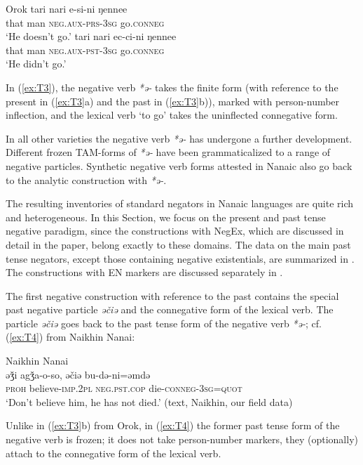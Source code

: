 \documentclass[output=paper]{langscibook}
\begin{document}
\ea Orok \label{ex:T3}
  \ea
	\gll tari	nari	e-si-ni	ŋennee\\
	that	man	\textsc{neg.aux-prs-3sg}	go.\textsc{conneg}\\
    \glt `He doesn’t go.' \citep[13]{tsumagari2009a}
  \ex
	\gll tari	nari	ec-ci-ni	ŋennee\\
	that	man	\textsc{neg.aux-pst-3sg}	go.\textsc{conneg}\\
	\glt `He didn’t go.' \citep[13]{tsumagari2009a}
\z \z

In (\ref{ex:T3}), the negative verb \textit{*ə-} takes the finite form (with reference to the present in (\ref{ex:T3}a) and the past in (\ref{ex:T3}b)), marked with person-number inflection, and the lexical verb ‘to go’ takes the uninflected connegative form.

In all other varieties the negative verb \textit{*ə-} has undergone a further development. Different frozen TAM-forms of \textit{*ə-} have been grammaticalized to a range of negative particles. Synthetic negative verb forms attested in Nanaic also go back to the analytic construction with \textit{*ə-}.

The resulting inventories of standard negators in Nanaic languages are quite rich and heterogeneous. In this Section, we focus on the present and past tense negative paradigm, since the constructions with NegEx, which are discussed in detail in the paper, belong exactly to these domains. The data on the main past tense negators, except those containing negative existentials, are summarized in . The constructions with EN markers are discussed separately in .

The first negative construction with reference to the past contains the special past negative particle \textit{əčiə} and the connegative form of the lexical verb. The particle \textit{əčiə} goes back to the past tense form of the negative verb \textit{*ə-}; cf. (\ref{ex:T4}) from Naikhin Nanai:

\ea Naikhin Nanai \label{ex:T4}\\
	\gll əǯi		agǯa-o-so,			əčiə				bu-də-ni=əmdə\\
	\textsc{proh}	believe-\textsc{imp.2pl}	\textsc{neg.pst.cop}	die-\textsc{conneg-3sg=quot}\\
	\glt `Don’t believe him, he has not died.' (text, Naikhin, our field data)
\z

Unlike in (\ref{ex:T3}b) from Orok, in (\ref{ex:T4}) the former past tense form of the negative verb is frozen; it does not take person-number markers, they (optionally) attach to the connegative form of the lexical verb.
\end{document}
